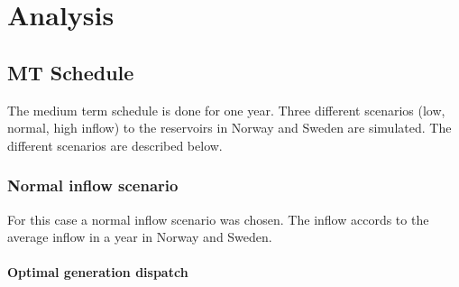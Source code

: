 \documentclass{article}
\begin{document}
\section{Analysis}

\subsection{MT Schedule}
The medium term schedule is done for one year. Three different scenarios (low, normal, high inflow) to the reservoirs in Norway and Sweden are simulated. The different scenarios are described below.

\subsubsection{Normal inflow scenario}
For this case a normal inflow scenario was chosen. The inflow accords to the average inflow in a year in Norway and Sweden.
\paragraph{Optimal generation dispatch\\}
\end{document}
